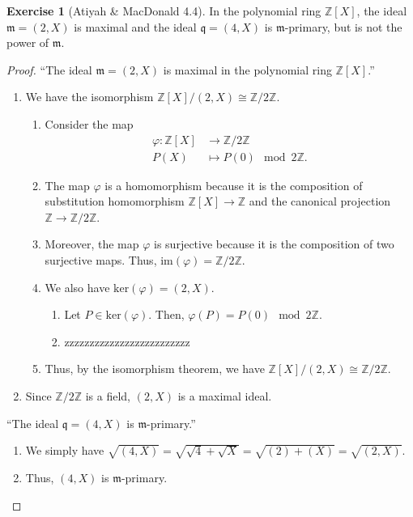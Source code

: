 \documentclass[a4paper]{book}
\theoremstyle{definition}
\newtheorem{exercise}{Exercise}[definition]
\begin{document}
\begin{exercise}[Atiyah \& MacDonald 4.4]
    In the polynomial ring \(\mathbb{Z}[X]\), the ideal \(\mathfrak{m} = (2, X)\) is maximal and the ideal \(\mathfrak{q} = (4, X)\) is \(\mathfrak{m}\)-primary, but is not the power of \(\mathfrak{m}\).
\end{exercise}
\begin{proof}
    ``The ideal \(\mathfrak{m} = (2, X)\) is maximal in the polynomial ring \(\mathbb{Z}[X]\).''
    \begin{enumerate}
        \item We have the isomorphism \(\mathbb{Z}[X] / (2, X) \cong \mathbb{Z} / 2 \mathbb{Z}\).
        \begin{enumerate}
            \item Consider the map
            \begin{align*}
                \varphi: \mathbb{Z}[X] &\longrightarrow \mathbb{Z} / 2 \mathbb{Z} \\
                P(X) &\mapsto P(0) \mod{2 \mathbb{Z}} \text{.}
            \end{align*}
            \item The map \(\varphi\) is a homomorphism because it is the composition of substitution homomorphism \(\mathbb{Z}[X] \longrightarrow \mathbb{Z}\) and the canonical projection \(\mathbb{Z} \longrightarrow \mathbb{Z} / 2 \mathbb{Z}\).
            \item Moreover, the map \(\varphi\) is surjective because it is the composition of two surjective maps. Thus, \(\text{im}(\varphi) = \mathbb{Z} / 2 \mathbb{Z}\).
            \item We also have \(\text{ker}(\varphi) = (2, X)\).
            \begin{enumerate}
                \item Let \(P \in \text{ker}(\varphi)\). Then, \(\varphi(P) = P(0) \mod{2\mathbb{Z}}\).
                \item zzzzzzzzzzzzzzzzzzzzzzzzz
            \end{enumerate}
            \item Thus, by the isomorphism theorem, we have \(\mathbb{Z}[X] / (2, X) \cong \mathbb{Z} / 2 \mathbb{Z}\).
        \end{enumerate}
        \item Since \(\mathbb{Z} / 2 \mathbb{Z}\) is a field, \((2, X)\) is a maximal ideal.
    \end{enumerate}

    \noindent``The ideal \(\mathfrak{q} = (4, X)\) is \(\mathfrak{m}\)-primary.''
    \begin{enumerate}
        \item We simply have \(\sqrt{(4, X)} = \sqrt{\sqrt{4} + \sqrt{X}}= \sqrt{(2) + (X)} = \sqrt{(2, X)}\).
        \item Thus, \((4, X)\) is \(\mathfrak{m}\)-primary.
    \end{enumerate}


\end{proof}
\end{document}
